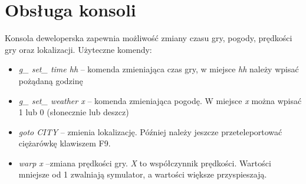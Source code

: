 \section{Obsługa konsoli}
Konsola deweloperska zapewnia możliwość zmiany czasu gry, pogody, prędkości gry oraz lokalizacji. Użyteczne komendy:
\begin{itemize}
\item \textit{g\_ set\_ time hh} -- komenda zmieniająca czas gry, w miejsce \textit{hh} należy wpisać pożądaną godzinę
\item \textit{g\_ set\_ weather x} -- komenda zmieniająca pogodę. W miejsce \textit{x} można wpisać 1 lub 0 (słonecznie lub deszcz)
\item \textit{goto CITY} -- zmienia lokalizację. Później należy jeszcze przeteleportować ciężarówkę klawiszem F9.
\item \textit{warp x} --zmiana prędkości gry. \textit{X} to współczynnik prędkości. Wartości mniejsze od 1 zwalniają symulator, a wartości większe przyspieszają.
\end{itemize}
